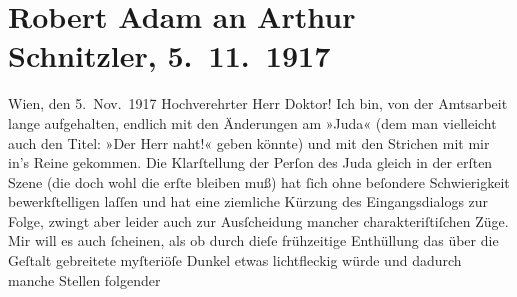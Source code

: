

         
         \newcommand{\erwaehntePersonen}{Personen: Titus Livius}
         \newcommand{\erwaehnteInstitutionen}{}
         \newcommand{\erwaehnteOrte}{Orte: Griechenland, Ostia Antica, Rom, Wien}
         \newcommand{\erwaehnteWerke}{Werke: Das Ende des Judas}
               \section[Robert Adam an Arthur Schnitzler, 5. 11. 1917]{ Robert Adam an Arthur Schnitzler, 5. 11. 1917}\nopagebreak{}\rehead{ }\begin{ledgroupsized}[t]{13cm}\normalsize\beginnumbering \toendnotes[C]{\smallbreak\pagebreak[2]} 
\pstart
           \raggedleft{}{\pb}Wien, den 5. Nov. 1917\pend
           \pstart\center{}Hochverehrter Herr Doktor!\pend\pstart
           Ich bin, von der Amtsarbeit lange aufgehalten, endlich mit den Änderungen am »Juda« (dem man vielleicht auch den Titel: »Der
                    Herr naht!« geben könnte) und mit den Strichen mit mir in’s Reine gekommen. Die
                    Klarſtellung der Perſon des Juda gleich in der erſten Szene (die doch wohl die
                    erſte bleiben muß) hat ſich ohne beſondere Schwierigkeit bewerkſtelligen laſſen
                    und hat eine ziemliche Kürzung des Eingangsdialogs zur Folge, zwingt aber leider
                    auch zur Ausſcheidung mancher charakteriſtiſchen Züge. Mir will es auch
                    ſcheinen,  als ob durch dieſe frühzeitige
                    Enthüllung das über die Geſtalt gebreitete myſteriöſe Dunkel etwas lichtfleckig
                    würde und  dadurch manche Stellen folgender

\end{ledgroupsized}
